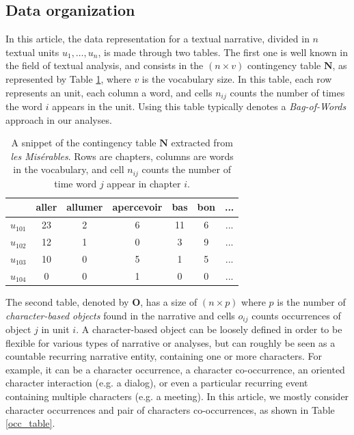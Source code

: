 \documentclass[
twocolumn,
]{ceurart}
\begin{document}
\subsection{Data organization}

In this article, the data representation for a textual narrative, divided in $n$ textual units $u_1, \ldots, u_n$, is made through two tables. The first one is well known in the field of textual analysis, and consists in the $(n \times v)$ contingency table $\mathbf{N}$, as represented by Table \ref{cont_table}, where $v$ is the vocabulary size. In this table, each row represents an unit, each column a word, and cells $n_{ij}$ counts the number of times the word $i$ appears in the unit. Using this table typically denotes a \emph{Bag-of-Words} approach in our analyses.

\begin{table}[h]
	\scriptsize
	\begin{tabular}{|c||c|c|c|c|c|c|}
		\hline
		& aller & allumer & apercevoir & bas & bon & ... \\
		\hline
		\hline 
		$u_{101}$ & 23 & 2 & 6 & 11 & 6 & ... \\
		\hline
		$u_{102}$ & 12 & 1 & 0 & 3 & 9 & ... \\
		\hline
		$u_{103}$ & 10 & 0 & 5 & 1 & 5 & ... \\
		\hline
		$u_{104}$ & 0 & 0 & 1 & 0 & 0 & ... \\
		\hline
	\end{tabular}
	\label{cont_table}
	\caption{A snippet of the contingency table $\mathbf{N}$ extracted from \emph{les Misérables}. Rows are chapters, columns are words in the vocabulary, and cell $n_{ij}$ counts the number of time word $j$ appear in chapter $i$.}
\end{table}

The second table, denoted by $\mathbf{O}$, has a size of $(n \times p)$ where $p$ is the number of \emph{character-based objects} found in the narrative and cells $o_{ij}$ counts occurrences of object $j$ in unit $i$. A character-based object can be loosely defined in order to be flexible for various types of narrative or analyses, but can roughly be seen as a countable recurring narrative entity, containing one or more characters. For example, it can be a character occurrence, a character co-occurrence, an oriented character interaction (e.g. a dialog), or even a particular recurring event containing multiple characters (e.g. a meeting). In this article, we mostly consider character occurrences and pair of characters co-occurrences, as shown in Table \ref{occ_table}. 
\end{document}
